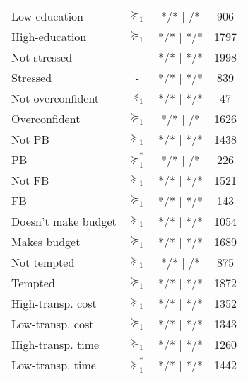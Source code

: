 \begin{tabular}{lccc}
Low-education & \cellcolor[rgb]{ .851,  .882,  .949} $\succeq_{1}$ & */*  |     /* & 906 \\
High-education & \cellcolor[rgb]{ .851,  .882,  .949} $\succeq_{1}$ & */*  |  */* & 1797 \\
Not stressed & -     & */*  |  */* & 1998 \\
Stressed & -     & */*  |  */* & 839 \\
Not overconfident & $\preceq_{1}$ & */*  |  */* & 47 \\
Overconfident & \cellcolor[rgb]{ .851,  .882,  .949} $\succeq_{1}$ & */*  |     /* & 1626 \\
Not PB & \cellcolor[rgb]{ .851,  .882,  .949} $\succeq_{1}$ & */*  |  */* & 1438 \\
PB    & \cellcolor[rgb]{ .557,  .663,  .859} $\succeq_{1}^*$ & */*  |     /* & 226 \\
Not FB & \cellcolor[rgb]{ .851,  .882,  .949} $\succeq_{1}$ & */*  |  */* & 1521 \\
FB    & \cellcolor[rgb]{ .851,  .882,  .949} $\succeq_{1}$ & */*  |  */* & 143 \\
Doesn't make budget & \cellcolor[rgb]{ .851,  .882,  .949} $\succeq_{1}$ & */*  |  */* & 1054 \\
Makes budget & \cellcolor[rgb]{ .851,  .882,  .949} $\succeq_{1}$ & */*  |  */* & 1689 \\
Not tempted & \cellcolor[rgb]{ .851,  .882,  .949} $\succeq_{1}$ & */*  |     /* & 875 \\
Tempted & \cellcolor[rgb]{ .851,  .882,  .949} $\succeq_{1}$ & */*  |  */* & 1872 \\
High-transp. cost & \cellcolor[rgb]{ .851,  .882,  .949} $\succeq_{1}$ & */*  |  */* & 1352 \\
Low-transp. cost & \cellcolor[rgb]{ .851,  .882,  .949} $\succeq_{1}$ & */*  |  */* & 1343 \\
High-transp. time & \cellcolor[rgb]{ .851,  .882,  .949} $\succeq_{1}$ & */*  |  */* & 1260 \\
Low-transp. time & \cellcolor[rgb]{ .557,  .663,  .859} $\succeq_{1}^*$ & */*  |  */* & 1442 \\
\bottomrule
\bottomrule
\end{tabular}%

